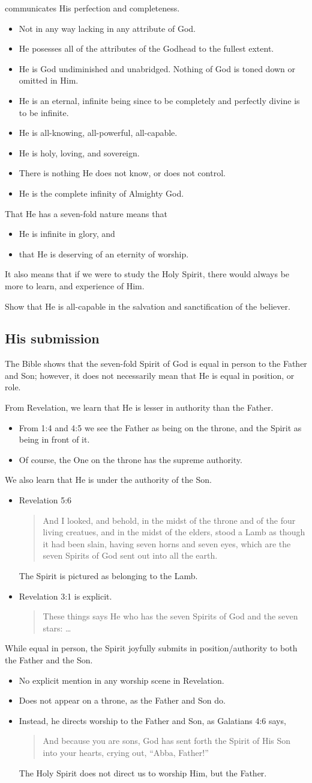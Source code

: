 \documentclass[12pt]{article}
\newcommand{\BI}{\begin{itemize}}
\newcommand{\EI}{\end{itemize}}
\newcommand{\I}{\item}
\newcommand{\Q}[1]{\begin{quote} #1 \end{quote}}
\begin{document}
    communicates His perfection and completeness.
\BI \I  Not in any way lacking in any attribute of God.
    \I  He posesses all of the attributes of the Godhead to the fullest extent.
    \I  He is God undiminished and unabridged. 
        Nothing of God is toned down or omitted in Him.
    \I  He is an eternal, infinite being since 
        to be completely and perfectly divine is to be infinite.
    \I  He is all-knowing, all-powerful, all-capable.
    \I  He is holy, loving, and sovereign.
    \I  There is nothing He does not know, or does not control.
    \I  He is the complete infinity of Almighty God. \EI
\I  That He has a seven-fold nature means that
\BI \I  He is infinite in glory, and
    \I  that He is deserving of an eternity of worship. \EI
\I  It also means that if we were to study the Holy Spirit, 
    there would always be more to learn, and experience of Him.
\I  Show that He is all-capable in the salvation and sanctification of the believer.

\subsection{His submission}
\I  The Bible shows that the seven-fold Spirit of God is equal in person to 
    the Father and Son;
    however, it does not necessarily mean that He is equal in position, or role.
\I  From Revelation, we learn that He is lesser in authority than the Father.
\BI \I  From 1:4 and 4:5 we see the Father as being on the throne,
        and the Spirit as being in front of it.
    \I  Of course, the One on the throne has the supreme authority. \EI
\I  We also learn that He is under the authority of the Son.
\BI \I  Revelation 5:6
        \Q{ And I looked, and behold, in the midst of the throne and 
            of the four living creatues,
            and in the midst of the elders,
            stood a Lamb as though it had been slain,
            having seven horns and seven eyes,
            which are the seven Spirits of God sent out into all the earth.}
        The Spirit is pictured as belonging to the Lamb.
    \I  Revelation 3:1 is explicit.
        \Q{ These things says He who has the seven Spirits of God and 
            the seven stars: \ldots} \EI
\I  While equal in person, the Spirit joyfully submits in position/authority
    to both the Father and the Son.
\BI \I  No explicit mention in any worship scene in Revelation.
    \I  Does not appear on a throne, as the Father and Son do.
    \I  Instead, he directs worship to the Father and Son,
        as Galatians 4:6 says,
        \Q{ And because you are sons, God has sent forth the Spirit of His Son
            into your hearts, crying out, ``Abba, Father!''}
        The Holy Spirit does not direct us to worship Him, but the Father. \EI
\end{document}
